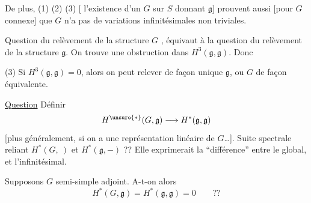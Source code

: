 De plus, (1) (2) (3) [ l'existence d'un $G$  sur $S$ donnant $\mathfrak g$] prouvent aussi [pour $G$ connexe] que $G$ n'a pas de variations infinitésimales non triviales.

Question du relèvement de la structure $G$ , équivaut à la question du relèvement de la structure $\mathfrak g$. On trouve une obstruction dans $H^3(\mathfrak g,\mathfrak g)$. Donc


(3) Si $H^3(\mathfrak g,\mathfrak g)=0$, alors on peut relever de façon  unique $\mathfrak g$, ou $G$ de façon équivalente.

\uline{Question} Définir
\[
H^{\unsure{*}}(G,\mathfrak g)\longrightarrow H^*(\mathfrak g,\mathfrak g)
\]
[plus généralement, si on a une représentation linéaire de $G$\ldots]. Suite spectrale reliant $H^*(G,\ )$ et $H^*(\mathfrak g,-)$ ?? Elle exprimerait la ``différence'' entre le global, et l'infinitésimal.

Supposons $G$ semi-simple adjoint. A-t-on alors
\[
H^*(G,\mathfrak g)=H^*(\mathfrak g,\mathfrak g)=0\qquad??
\]
